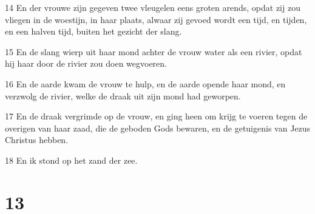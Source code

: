 \par 14 En der vrouwe zijn gegeven twee vleugelen eens groten arends, opdat zij zou vliegen in de woestijn, in haar plaats, alwaar zij gevoed wordt een tijd, en tijden, en een halven tijd, buiten het gezicht der slang.
\par 15 En de slang wierp uit haar mond achter de vrouw water als een rivier, opdat hij haar door de rivier zou doen wegvoeren.
\par 16 En de aarde kwam de vrouw te hulp, en de aarde opende haar mond, en verzwolg de rivier, welke de draak uit zijn mond had geworpen.
\par 17 En de draak vergrimde op de vrouw, en ging heen om krijg te voeren tegen de overigen van haar zaad, die de geboden Gods bewaren, en de getuigenis van Jezus Christus hebben.
\par 18 En ik stond op het zand der zee.

\chapter{13}

